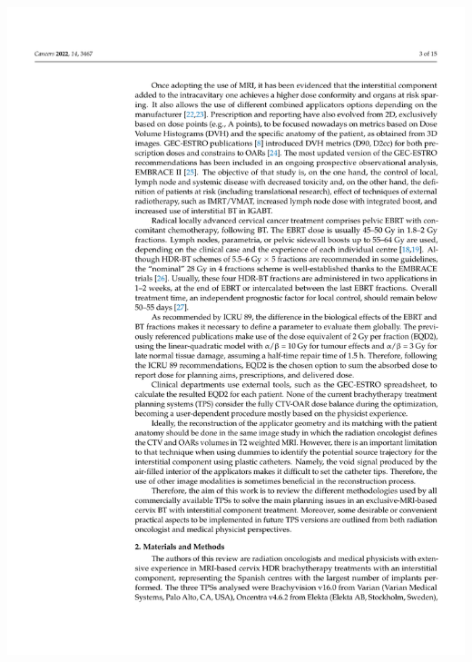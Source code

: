 \documentclass[
  a4paper,
]{scrreprt}
\begin{document}
\includegraphics{articulos/cancers/cancers-03.png}
\end{document}
